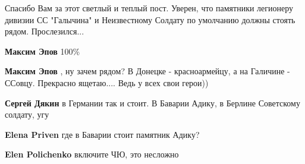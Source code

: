 \begin{itemize}
 

Спасибо Вам за этот светлый и теплый пост. Уверен, что памятники легионеру
дивизии СС "Галычина" и Неизвестному Солдату по умолчанию должны стоять рядом.
Прослезился...

\begin{itemize}
 
\textbf{Максим Эпов} 100\%

 
\textbf{Максим Эпов} , ну зачем рядом? В Донецке - красноармейцу, а на Галичине - ССовцу. Прекрасно ящетаю.... Ведь у всех свои герои))

 
\textbf{Сергей Дякин} в Германии так и стоит. В Баварии Адику, в Берлине Советскому солдату, угу

 
\textbf{Elena Priven} где в Баварии стоит памятник Адику?

 
\textbf{Elen Polichenko} включите ЧЮ, это несложно


\end{itemize}
\end{itemize}
